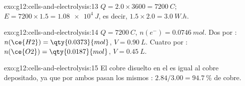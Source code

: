 \begin{solution}{exo:g12:cells-and-electrolysis:13}
$Q = 2.0 \times 3600 = \qty{7200}{C}$; $E = 7200 \times 1.5 =
\qty{1.08e4}{J}$, es decir, $1.5 \times 2.0 = \qty{3.0}{W.h}$.
\end{solution}

\begin{solution}{exo:g12:cells-and-electrolysis:14}
$Q = \qty{7200}{C}$, $n(e^-) = \qty{0.0746}{mol}$. Dos  por
: $n(\ce{H2}) = \qty{0.0373}{mol}$, $V = \qty{0.90}{L}$. Cuatro por
: $n(\ce{O2}) = \qty{0.0187}{mol}$, $V = \qty{0.45}{L}$.
\end{solution}

\begin{solution}{exo:g12:cells-and-electrolysis:15}
El cobre disuelto en el  es igual al cobre depositado, ya que por
ambos pasan los mismos : $2.84/3.00 = \qty{94.7}{\percent}$ de
cobre.
\end{solution}

